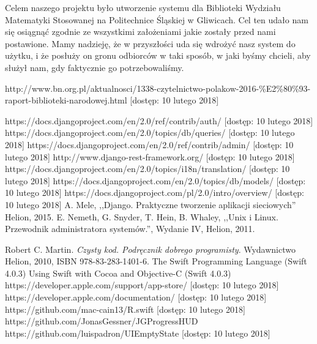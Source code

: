 \documentclass[twoside]{projektInzynierskiMS}
\begin{document}
Celem naszego projektu było utworzenie systemu dla Biblioteki Wydziału Matematyki Stosowanej na Politechnice Śląskiej w Gliwicach. Cel ten udało nam się osiągnąć zgodnie ze wszystkimi założeniami jakie zostały przed nami postawione. Mamy nadzieję, że w przyszłości uda się wdrożyć nasz system do użytku, i że posłuży on gronu odbiorców w taki sposób, w jaki byśmy chcieli, aby służył nam, gdy faktycznie go potrzebowaliśmy.


\begin{thebibliography}{12}

 http://www.bn.org.pl/aktualnosci/1338-czytelnictwo-polakow-2016-\%E2\%80\%93-raport-biblioteki-narodowej.html [dostęp: 10 lutego 2018]

 https://docs.djangoproject.com/en/2.0/ref/contrib/auth/ [dostęp: 10 lutego 2018]
 https://docs.djangoproject.com/en/2.0/topics/db/queries/ [dostęp: 10 lutego 2018]
 https://docs.djangoproject.com/en/2.0/ref/contrib/admin/ [dostęp: 10 lutego 2018]
 http://www.django-rest-framework.org/  [dostęp: 10 lutego 2018]
 https://docs.djangoproject.com/en/2.0/topics/i18n/translation/ [dostęp: 10 lutego 2018]
 https://docs.djangoproject.com/en/2.0/topics/db/models/ [dostęp: 10 lutego 2018]
 https://docs.djangoproject.com/pl/2.0/intro/overview/ [dostęp: 10 lutego 2018]
 A. Mele, ,,Django. Praktyczne tworzenie aplikacji sieciowych'' Helion, 2015.
 E. Nemeth, G. Snyder, T. Hein, B. Whaley, ,,Unix i Linux. Przewodnik
administratora systemów.'', Wydanie IV, Helion, 2011.


Robert C. Martin. 
\textit{Czysty kod. Podręcznik dobrego programisty}. 
Wydawnictwo Helion, 2010, ISBN 978-83-283-1401-6.
 The Swift Programming Language (Swift 4.0.3)
 Using Swift with Cocoa and Objective-C (Swift 4.0.3)
 https://developer.apple.com/support/app-store/ [dostęp: 10 lutego 2018]
 https://developer.apple.com/documentation/ [dostęp: 10 lutego 2018]
 https://github.com/mac-cain13/R.swift [dostęp: 10 lutego 2018]
 https://github.com/JonasGessner/JGProgressHUD
 https://github.com/luispadron/UIEmptyState [dostęp: 10 lutego 2018]


\end{thebibliography}
\end{document}
